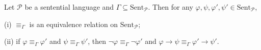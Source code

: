 Let $\mathcal{P}$ be a sentential language and $\Gamma \subseteq \text{Sent}_{\mathcal{P}}$. Then for any $\varphi, \psi, \varphi', \psi' \in \text{Sent}_{\mathcal{P}}$,

(i) $\equiv_{\Gamma}$ is an equivalence relation on $\text{Sent}_{\mathcal{P}}$;

(ii) if $\varphi \equiv_{\Gamma} \varphi'$ and $\psi \equiv_{\Gamma} \psi'$, then $\neg \varphi \equiv_{\Gamma} \neg \varphi'$ and $\varphi \rightarrow \psi \equiv_{\Gamma} \varphi' \rightarrow \psi'$.
